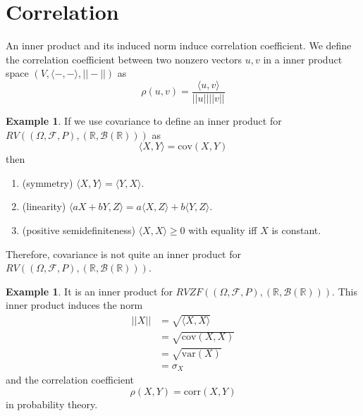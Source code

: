 \documentclass[12pt]{amsart}
\theoremstyle{definition}
\newtheorem{example}[theorem]{Example}
\begin{document}
\section{Correlation} An inner product and its induced norm induce correlation coefficient.
\dfn We define the correlation coefficient between two nonzero vectors $u, v$ in a inner product space $(V, \langle -,- \rangle, ||-||)$ as
$$\rho(u, v) = \frac{\langle u, v \rangle}{||u|| ||v||}$$
\vfill
\pagebreak

\begin{example} If we use covariance to define an inner product for $RV((\Omega, \mathcal{F},P), (\mathbb{R},\mathcal{B}(\mathbb{R})))$ as
$$\langle X, Y \rangle = \text{cov}(X, Y)$$
then
\begin{enumerate}[\indent 1.]
\item (symmetry) $\langle X, Y \rangle = \langle Y, X \rangle$.
\item (linearity) $\langle aX + bY, Z \rangle = a \langle X, Z \rangle + b \langle Y, Z \rangle$.
\item (positive semidefiniteness) $\langle X, X \rangle \geq 0$ with equality iff $X$ is constant.
\end{enumerate}

Therefore, covariance is not quite an inner product for $RV((\Omega, \mathcal{F},P), (\mathbb{R},\mathcal{B}(\mathbb{R})))$. 
\end{example}
\vspace{30pt}

\begin{example} It is an inner product for $RVZF((\Omega, \mathcal{F},P), (\mathbb{R},\mathcal{B}(\mathbb{R})))$. This inner product induces the norm
\begin{align*}
||X|| & = \sqrt{\langle X, X \rangle} \\
 & = \sqrt{\text{cov}(X,X)} \\
 & = \sqrt{\text{var}(X)} \\
 & = \sigma_X
\end{align*}
and the correlation coefficient
$$\rho(X, Y) = \text{corr}(X, Y)$$
in probability theory. 
\end{example}
\vfill
\pagebreak
\end{document}
